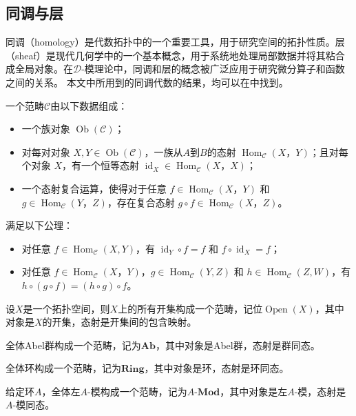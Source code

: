 \subsection{同调与层}
同调（homology）是代数拓扑中的一个重要工具，用于研究空间的拓扑性质。层（sheaf）是现代几何学中的一个基本概念，用于系统地处理局部数据并将其粘合成全局对象。在$\mathcal{D}$-模理论中，同调和层的概念被广泛应用于研究微分算子和函数之间的关系。
本文中所用到的同调代数的结果，均可以在\cite{陈志杰2024代数基础}中找到。
\begin{definition}
    一个范畴$\mathcal{C}$由以下数据组成：
    \begin{itemize}
        \item 一个族对象 $\operatorname{Ob}(\mathcal{C})$；
        \item 对每对对象 $X,Y\in \operatorname{Ob}(\mathcal{C})$，一族从$A$到$B$的态射 $\operatorname{Hom}_{\mathcal{C}}(X，Y)$；且对每个对象 $X$，有一个恒等态射 $\operatorname{id}_X\in \operatorname{Hom}_{\mathcal{C}}(X，X)$；
        \item 一个态射复合运算，使得对于任意 $f\in \operatorname{Hom}_{\mathcal{C}}(X，Y)$ 和 $g\in \operatorname{Hom}_{\mathcal{C}}(Y，Z)$，存在复合态射 $g\circ f\in \operatorname{Hom}_{\mathcal{C}}(X，Z)$。
    \end{itemize}
    满足以下公理：
    \begin{itemize}
        \item 对任意 $f\in \operatorname{Hom}_{\mathcal{C}}(X,Y)$，有 $\operatorname{id}_Y\circ f=f$ 和 $f\circ \operatorname{id}_X=f$；
        \item 对任意 $f\in \operatorname{Hom}_{\mathcal{C}}(X，Y)$，$g\in \operatorname{Hom}_{\mathcal{C}}(Y,Z)$ 和 $h\in \operatorname{Hom}_{\mathcal{C}}(Z,W)$，有 $h\circ (g\circ f)=(h\circ g)\circ f$。
    \end{itemize}
\end{definition}

\begin{example}
    设$X$是一个拓扑空间，则$X$上的所有开集构成一个范畴，记位$\operatorname{Open}(X)$，其中对象是$X$的开集，态射是开集间的包含映射。
\end{example}
\begin{example}
    全体Abel群构成一个范畴，记为$\mathbf{Ab}$，其中对象是Abel群，态射是群同态。
\end{example}
\begin{example}
    全体环构成一个范畴，记为$\mathbf{Ring}$，其中对象是环，态射是环同态。
\end{example}
\begin{example}
    给定环$A$，全体左$A$-模构成一个范畴，记为$A\text{-}\mathbf{Mod}$，其中对象是左$A$-模，态射是$A$-模同态。
\end{example}


